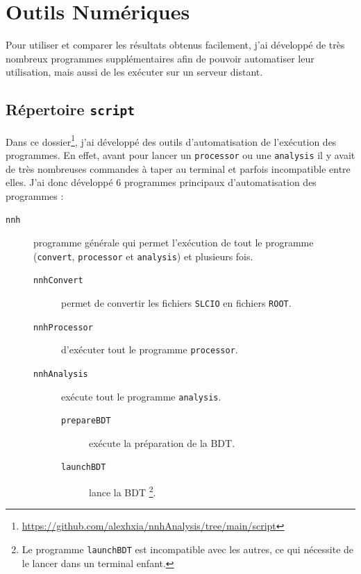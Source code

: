 \documentclass[10pt,a4paper]{report}
\newcommand{\ROOT}{\texttt{ROOT}\xspace}
\newcommand{\SLCIO}{\texttt{SLCIO}\xspace}
\newcommand{\convert}{\texttt{convert}\xspace}
\newcommand{\processor}{\texttt{processor}\xspace}
\newcommand{\analysis}{\texttt{analysis}\xspace}
\begin{document}

\chapter{Outils Numériques}

Pour utiliser et comparer les résultats obtenus facilement, j'ai développé de très nombreux programmes supplémentaires afin de pouvoir automatiser leur utilisation, mais aussi de les exécuter sur un serveur distant. 

\section{Répertoire \texttt{script}}

Dans ce dossier\footnote{\url{https://github.com/alexhxia/nnhAnalysis/tree/main/script}}, j'ai développé des outils d'automatisation de l'exécution des programmes. En effet, avant pour lancer un \processor ou une \analysis il y avait de très nombreuses commandes à taper au terminal et parfois incompatible entre elles.
J'ai donc développé 6 programmes principaux d'automatisation des programmes :

\begin{description}
	
	\item[\texttt{nnh}]	programme générale qui permet l'exécution de tout le programme (\convert, \processor et \analysis) et plusieurs fois.
	\begin{description}

	\item[\texttt{nnhConvert}] permet de convertir les fichiers \SLCIO en fichiers \ROOT.
	
	\item[\texttt{nnhProcessor}] d'exécuter tout le programme \processor.
	
	\item[\texttt{nnhAnalysis}] exécute tout le programme \analysis.
	
	\begin{description}
		
		\item[\texttt{prepareBDT}] exécute la préparation de la BDT.
		
		\item[\texttt{launchBDT}] lance la BDT \footnote{Le programme \texttt{launchBDT} est incompatible avec les autres, ce qui nécessite de le lancer dans un terminal enfant.}.
		
	\end{description}
	\end{description}
	
\end{description}
\end{document}
